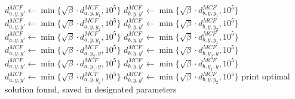 \documentclass[../thesis.tex]{subfiles}
\begin{document}
\begin{algorithm}[H]
\begin{algorithmic}

    \STATE $d^{MCF}_{a,y,y'}\gets\min\{\sqrt\beta\cdot d^{MCF}_{a,y,y_1},10^5\}$
    \STATE $d^{MCF}_{b,y,y'}\gets\min\{\sqrt\beta\cdot d^{MCF}_{b,y,y_1},10^5\}$    
    \STATE $d^{MCF}_{a,y,y'}\gets\min\{\sqrt\beta\cdot d^{MCF}_{a,y,y_2},10^5\}$
    \STATE $d^{MCF}_{b,y,y'}\gets\min\{\sqrt\beta\cdot d^{MCF}_{b,y,y_2},10^5\}$
    \ENDFOR
    \STATE $d^{MCF}_{a,y,y'}\gets\min\{\sqrt\beta\cdot d^{MCF}_{a,y,y_1},10^5\}$
    \STATE $d^{MCF}_{b,y,y'}\gets\min\{\sqrt\beta\cdot d^{MCF}_{b,y,y_1},10^5\}$    
    \STATE $d^{MCF}_{a,y,y'}\gets\min\{\sqrt\beta\cdot d^{MCF}_{a,y_2,y},10^5\}$
    \STATE $d^{MCF}_{b,y,y'}\gets\min\{\sqrt\beta\cdot d^{MCF}_{b,y_2,y},10^5\}$
    \ENDFOR
    \STATE $d^{MCF}_{a,y,y'}\gets\min\{\sqrt\beta\cdot d^{MCF}_{a,y_1,y},10^5\}$
    \STATE $d^{MCF}_{b,y,y'}\gets\min\{\sqrt\beta\cdot d^{MCF}_{b,y_1,y},10^5\}$    
    \STATE $d^{MCF}_{a,y,y'}\gets\min\{\sqrt\beta\cdot d^{MCF}_{a,y,y_2},10^5\}$
    \STATE $d^{MCF}_{b,y,y'}\gets\min\{\sqrt\beta\cdot d^{MCF}_{b,y,y_2},10^5\}$
    \ENDFOR
    \ENDFOR
    \ENDIF
    \ENDIF
    \ENDWHILE
    \STATE print optimal solution found, saved in designated parameters
    \end{algorithmic}
    \end{algorithm}
\end{document}
